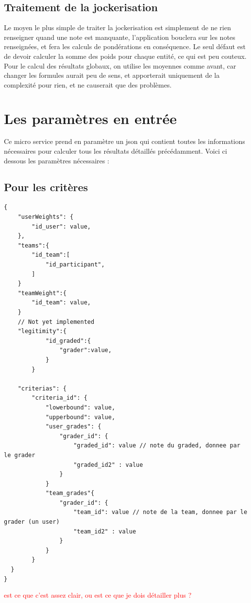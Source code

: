\documentclass[colorised, sobre]{template} %
\begin{document}
    \subsection{Traitement de la jockerisation}
    Le moyen le plus simple de  traiter la jockerisation est simplement de ne rien renseigner quand une note est manquante, l'application bouclera sur les notes renseignées, et fera les calculs de pondérations en conséquence. Le seul défaut est de devoir calculer la somme des poids pour chaque entité, ce qui est peu couteux. Pour le calcul des résultats globaux, on utilise les moyennes comme avant, car changer les formules aurait peu de sens, et apporterait uniquement de la complexité pour rien, et ne causerait que des problèmes.
    

    
\section{Les paramètres en entrée}
    Ce micro service prend en paramètre un json qui contient toutes les informations nécessaires pour calculer tous les résultats détaillés précédamment. Voici ci dessous les paramètres nécessaires : 
    \subsection{Pour les critères}
        \begin{lstlisting}
{
    "userWeights": {
        "id_user": value,
    },
    "teams":{
        "id_team":[
            "id_participant",
        ]
    }
    "teamWeight":{
        "id_team": value, 
    }
    // Not yet implemented
    "legitimity":{
            "id_graded":{
                "grader":value,
            }
        }

    "criterias": {
        "criteria_id": {
            "lowerbound": value,
            "upperbound": value,
            "user_grades": {
                "grader_id": {
                    "graded_id": value // note du graded, donnee par le grader
                    "graded_id2" : value
                }
            }
            "team_grades"{
                "grader_id": {
                    "team_id": value // note de la team, donnee par le grader (un user)
                    "team_id2" : value
                }
            }
        }
  }
}
        \end{lstlisting}
    \textcolor{red}{est ce que c'est assez clair, ou est ce que je dois détailler plus ?}
    \newpage
\end{document}
